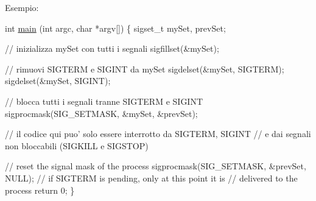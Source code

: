 Esempio\+: 
\begin{DoxyCode}
\textcolor{keywordtype}{int} \hyperlink{client_8h_a0ddf1224851353fc92bfbff6f499fa97}{main} (\textcolor{keywordtype}{int} argc, \textcolor{keywordtype}{char} *argv[]) \{
    sigset\_t mySet, prevSet;

    \textcolor{comment}{// inizializza mySet con tutti i segnali}
    sigfillset(&mySet);

    \textcolor{comment}{// rimuovi SIGTERM e SIGINT da mySet}
    sigdelset(&mySet, SIGTERM);
    sigdelset(&mySet, SIGINT);

    \textcolor{comment}{// blocca tutti i segnali tranne SIGTERM e SIGINT}
    sigprocmask(SIG\_SETMASK, &mySet, &prevSet);

    \textcolor{comment}{// il codice qui puo' solo essere interrotto da SIGTERM, SIGINT}
    \textcolor{comment}{// e dai segnali non bloccabili (SIGKILL e SIGSTOP)}

    \textcolor{comment}{// reset the signal mask of the process}
    sigprocmask(SIG\_SETMASK, &prevSet, NULL);
    \textcolor{comment}{// if SIGTERM is pending, only at this point it is}
    \textcolor{comment}{// delivered to the process}
    \textcolor{keywordflow}{return} 0;
\}
\end{DoxyCode}
 